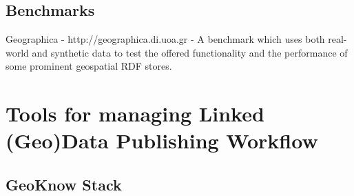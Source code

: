 \begin{itemize}

\subsection{Benchmarks}
Geographica - http://geographica.di.uoa.gr - A benchmark which uses both real-world and synthetic data to test the offered functionality and the performance of some prominent geospatial RDF stores.

\section{Tools for managing Linked (Geo)Data Publishing Workflow}
\label{sec:toolLD}

\subsection{GeoKnow Stack}
\label{sec:geoknow}


\end{itemize}
